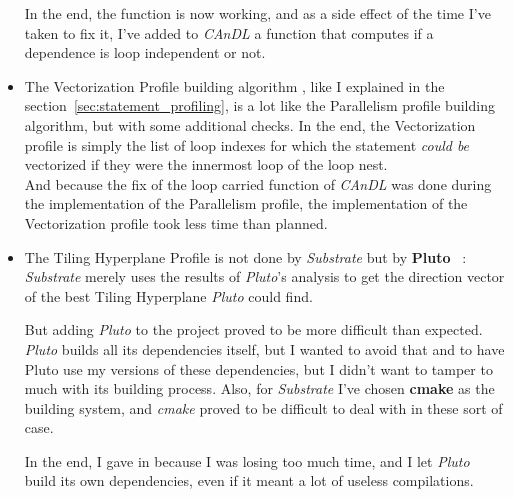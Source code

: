 \documentclass[paper=a4, fontsize=11.5pt]{scrartcl}
\numberwithin{equation}{section}        %
\numberwithin{figure}{section}          %
\numberwithin{table}{section}               %
\begin{document}
\begin{itemize}
            In the end, the function is now working, and as a side effect of the time I've taken
            to fix it, I've added to \textit{CAnDL} a function that computes if a dependence
            is loop independent or not.
        \item The Vectorization Profile building algorithm
            , like I explained in the section~\ref{sec:statement_profiling}, is a lot like
            the Parallelism profile building algorithm, but with some additional checks.
            In the end, the Vectorization profile is simply the list of loop indexes for which
            the statement \textit{could be} vectorized if they were the innermost loop of the loop nest.\\

            And because the fix of the loop carried function of \textit{CAnDL} was done during
            the implementation of the Parallelism profile, the implementation of the
            Vectorization profile took less time than planned.
        \item The Tiling Hyperplane Profile is not done by \textit{Substrate} but by
            \textbf{Pluto}~\cite{pluto} : \textit{Substrate} merely uses the results of
            \textit{Pluto}'s analysis to get the direction vector of the best Tiling Hyperplane
            \textit{Pluto} could find.

            But adding \textit{Pluto} to the project proved to be more difficult than expected.
            \textit{Pluto} builds all its dependencies itself, but I wanted to avoid that and
            to have Pluto use my versions of these dependencies, but I didn't want to tamper
            to much with its building process. Also, for \textit{Substrate} I've chosen \textbf{cmake}
            as the building system, and \textit{cmake} proved to be difficult to deal with in these
            sort of case.

            In the end, I gave in because I was losing too much time, and I let \textit{Pluto} build
            its own dependencies, even if it meant a lot of useless compilations.
    \end{itemize}
    
\end{document}
